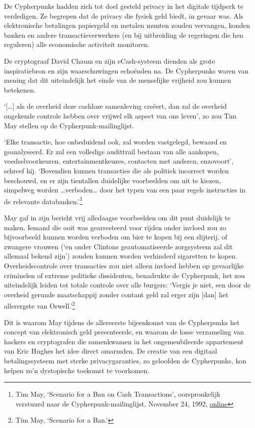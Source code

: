 \documentclass[
  a5paper,
  smalldemyvopaper,11pt,twoside,onecolumn,openright,extrafontsizes]{memoir}
\begin{document}
De Cypherpunks hadden zich tot doel gesteld privacy in het digitale
tijdperk te verdedigen. Ze begrepen dat de privacy die fysiek geld
biedt, in gevaar was. Als elektronische betalingen papiergeld en metalen
munten zouden vervangen, konden banken en andere transactieverwerkers
(en bij uitbreiding de regeringen die hen reguleren) alle economische
activiteit monitoren.

De cryptograaf David Chaum en zijn eCash-systeem dienden als grote
inspiratiebron en zijn waarschuwingen echoënden na. De Cypherpunks waren
van mening dat dit uiteindelijk het einde van de menselijke vrijheid zou
kunnen betekenen.

`{[}\ldots{]} als de overheid deze cashloze samenleving creëert, dan zal
de overheid ongekende controle hebben over vrijwel elk aspect van ons
leven', zo zou Tim May stellen op de Cypherpunk-mailinglijst.

`Elke transactie, hoe onbeduidend ook, zal worden vastgelegd, bewaard en
geanalyseerd. Er zal een volledige audittrail bestaan van alle aankopen,
voedselvoorkeuren, entertainmentkeuzes, contacten met anderen,
enzovoort', schreef hij. `Bovendien kunnen transacties die als politiek
incorrect worden beschouwd, en er zijn tientallen duidelijke voorbeelden
om uit te kiezen, simpelweg worden \ldots verboden\ldots{} door het
typen van een paar regels instructies in de relevante
databanken.'\footnote{Tim May, `Scenario for a Ban on Cash
  Transactions', oorspronkelijk verstuurd naar de
  Cypherpunk-mailinglijst, November 24, 1992,
  \href{https://cypherpunks.venona.com/date/1992/11/msg00211.html}{online}}

May gaf in zijn bericht vrij alledaagse voorbeelden om dit punt
duidelijk te maken. Iemand die ooit was gearresteerd voor rijden onder
invloed zou zo bijvoorbeeld kunnen worden verboden om bier te kopen bij
een slijterij, of zwangere vrouwen (`en onder Clintons geautomatiseerde
zorgsysteem zal dit allemaal bekend zijn') zouden kunnen worden
verhinderd sigaretten te kopen. Overheidscontrole over transacties zou
niet alleen invloed hebben op gevaarlijke criminelen of extreme
politieke dissidenten, benadrukte de Cypherpunk, het zou uiteindelijk
leiden tot totale controle over alle burgers: `Vergis je niet, een door
de overheid gerunde maatschappij zonder contant geld zal erger zijn
{[}dan{]} het allerergste van Orwell.'\footnote{Tim May, `Scenario for a
  Ban.'}

Dit is waarom May tijdens de allereerste bijeenkomst van de Cypherpunks
het concept van elektronisch geld presenteerde, en waarom de losse
verzameling van hackers en cryptografen die samenkwamen in het
ongemeubileerde appartement van Eric Hughes het idee direct omarmden. De
creatie van een digitaal betalingssysteem met sterke privacygaranties,
zo geloofden de Cypherpunks, kon helpen zo'n dystopische toekomst te
voorkomen.
\end{document}
